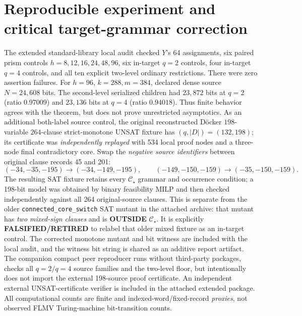 \documentclass[10pt]{article}
\begin{document}
\section{Reproducible experiment and critical target-grammar correction}
The extended standard-library local audit checked \(Y\)'s 64 assignments, six paired prism controls \(h=8,12,16,24,48,96\), six in-target \(q=2\) controls, four in-target \(q=4\) controls, and all ten explicit two-level ordinary restrictions. There were zero assertion failures. For \(h=96\), \(k=288,m=384\), declared dense source \(N=24{,}608\) bits. The second-level serialized children had \(23{,}872\) bits at \(q=2\) (ratio \(0.97009\)) and \(23{,}136\) bits at \(q=4\) (ratio \(0.94018\)). Thus finite behavior agrees with the theorem, but does not prove unrestricted asymptotics.
As an additional both-label source control, the original reconstructed D\"ocker \(198\)-variable \(264\)-clause strict-monotone UNSAT fixture has \((q,|D|)=(132,198)\); its certificate was \emph{independently replayed} with 534 local proof nodes and a three-node final contradictory core. Swap the \emph{negative source identifiers} between original clause records 45 and 201:
\[
(-34,-35,-195)\to(-34,-149,-195),\qquad
(-149,-150,-159)\to(-35,-150,-159).
\]
The resulting SAT fixture retains every \(\mathcal C_\star\) grammar and occurrence condition; a 198-bit model was obtained by binary feasibility MILP and then checked independently against all 264 original-source clauses. This is separate from the older \texttt{connected\_core\_switch} SAT mutant in the attached archive: that mutant has \emph{two mixed-sign clauses} and is \textbf{OUTSIDE} \(\mathcal C_\star\). It is explicitly \textbf{FALSIFIED/RETIRED} to relabel that older mixed fixture as an in-target control. The corrected monotone mutant and bit witness are included with the local audit, and the witness bit string is shared as an additive report artifact.
The companion compact peer reproducer runs without third-party packages, checks all \(q=2/q=4\) source families and the two-level floor, but intentionally does not import the external 198-source proof certificate. An independent external UNSAT-certificate verifier is included in the attached extended package. All computational counts are finite and indexed-word/fixed-record \emph{proxies}, not observed FLMV Turing-machine bit-transition counts.
\end{document}
